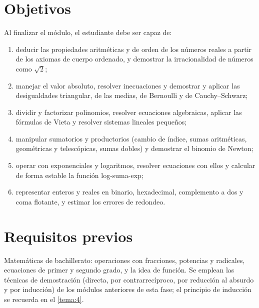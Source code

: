 \documentclass[11pt,a4paper,twoside,openany]{book}
\begin{document}
\section*{Objetivos}
Al finalizar el módulo, el estudiante debe ser capaz de:
\begin{enumerate}[label=\arabic*.]
  \item deducir las propiedades aritméticas y de orden de los números reales a partir de los axiomas de cuerpo ordenado, y demostrar la irracionalidad de números como $\sqrt{2}$;
  \item manejar el valor absoluto, resolver inecuaciones y demostrar y aplicar las desigualdades triangular, de las medias, de Bernoulli y de Cauchy--Schwarz;
  \item dividir y factorizar polinomios, resolver ecuaciones algebraicas, aplicar las fórmulas de Vieta y resolver sistemas lineales pequeños;
  \item manipular sumatorios y productorios (cambio de índice, sumas aritméticas, geométricas y telescópicas, sumas dobles) y demostrar el binomio de Newton;
  \item operar con exponenciales y logaritmos, resolver ecuaciones con ellos y calcular de forma estable la función log-suma-exp;
  \item representar enteros y reales en binario, hexadecimal, complemento a dos y coma flotante, y estimar los errores de redondeo.
\end{enumerate}

\section*{Requisitos previos}
Matemáticas de bachillerato: operaciones con fracciones, potencias y radicales, ecuaciones de primer y segundo grado, y la idea de función. Se emplean las técnicas de demostración (directa, por contrarrecíproco, por reducción al absurdo y por inducción) de los módulos anteriores de esta fase; el principio de inducción se recuerda en el \cref{tema:4}.
\end{document}
